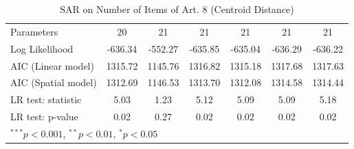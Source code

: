 \begin{table}[!h]
\begin{center}
\begin{tabular}{l c c c c c c }
Parameters              & 20           & 21           & 21           & 21           & 21           & 21           \\
Log Likelihood          & -636.34      & -552.27      & -635.85      & -635.04      & -636.29      & -636.22      \\
AIC (Linear model)      & 1315.72      & 1145.76      & 1316.82      & 1315.18      & 1317.68      & 1317.63      \\
AIC (Spatial model)     & 1312.69      & 1146.53      & 1313.70      & 1312.08      & 1314.58      & 1314.44      \\
LR test: statistic      & 5.03         & 1.23         & 5.12         & 5.09         & 5.09         & 5.18         \\
LR test: p-value        & 0.02         & 0.27         & 0.02         & 0.02         & 0.02         & 0.02         \\
\bottomrule
\multicolumn{7}{l}{\scriptsize{$^{***}p<0.001$, $^{**}p<0.01$, $^*p<0.05$}}
\end{tabular}
\caption{SAR on Number of Items of Art. 8 (Centroid Distance)}
\label{table:coefficients}
\end{center}
\end{table}
